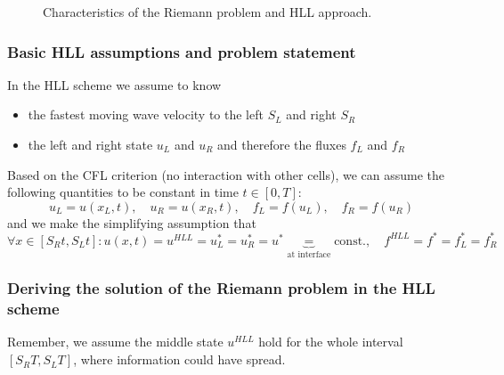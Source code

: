 \begin{figure}[htb!]
    \centering
    
    \caption{Characteristics of the Riemann problem and HLL approach.}
    \label{fig:char_hll}
\end{figure}

\subsubsection{Basic HLL assumptions and problem statement}
In the HLL scheme we assume to know
\begin{itemize}
    \item the fastest moving wave velocity to the left $S_L$ and right $S_R$
    \item the left and right state $u_L$ and $u_R$ and therefore the fluxes $f_L$ and $f_R$
\end{itemize}
Based on the CFL criterion (no interaction with other cells), we can assume the following quantities to be constant in time $t \in [0, T]$:
\begin{equation}
    u_L = u(x_L, t), \quad u_R = u(x_R, t), \quad f_L = f(u_L), \quad f_R = f(u_R)
\end{equation}
and we make the simplifying assumption that
\begin{equation}
    \forall x \in [S_R t, S_L t]: u(x, t) = u^{HLL} = u_L^* = u_R^* = u^* \underbrace{=}_{\text{at interface}} \text{const.}, \quad f^{HLL} = f^* = f_L^* = f_R^*
\end{equation}

\subsubsection{Deriving the solution of the Riemann problem in the HLL scheme}

Remember, we assume the middle state $u^{HLL}$ hold for the whole interval $[S_R T, S_L T]$, where
information could have spread.

